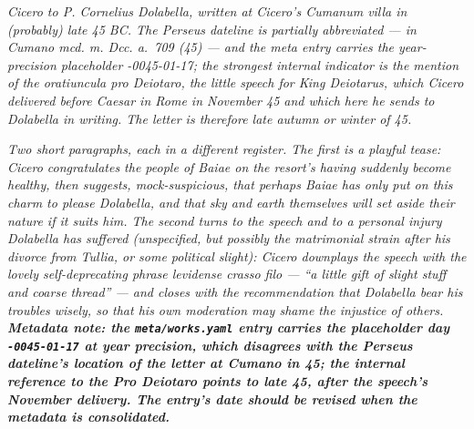 
\textit{Cicero to P. Cornelius Dolabella, written at
Cicero's Cumanum villa in (probably) late 45 BC. The
Perseus dateline is partially abbreviated --- \textit{in
Cumano mcd. m. Dcc. a.~709 (45)} --- and the meta entry
carries the year-precision placeholder \textit{-0045-01-17};
the strongest internal indicator is the mention of the
\textit{oratiuncula pro Deiotaro}, the little speech for
King Deiotarus, which Cicero delivered before Caesar in
Rome in November 45 and which here he sends to Dolabella
in writing. The letter is therefore late autumn or winter
of 45.}

\textit{Two short paragraphs, each in a different
register. The first is a playful tease: Cicero
congratulates the people of Baiae on the resort's having
suddenly become healthy, then suggests, mock-suspicious,
that perhaps Baiae has only put on this charm to please
Dolabella, and that sky and earth themselves will set
aside their nature if it suits him. The second turns to
the speech and to a personal injury Dolabella has
suffered (unspecified, but possibly the matrimonial
strain after his divorce from Tullia, or some political
slight): Cicero downplays the speech with the lovely
self-deprecating phrase \textit{levidense crasso filo} ---
``a little gift of slight stuff and coarse thread''
--- and closes with the recommendation that Dolabella
bear his troubles wisely, so that his own moderation may
shame the injustice of others. \textbf{Metadata note: the
\texttt{meta/works.yaml} entry carries the placeholder
day \texttt{-0045-01-17} at year precision, which
disagrees with the Perseus dateline's location of the
letter at \textit{Cumano} in 45; the internal reference to
the Pro Deiotaro points to late 45, after the speech's
November delivery. The entry's date should be revised
when the metadata is consolidated.}}
